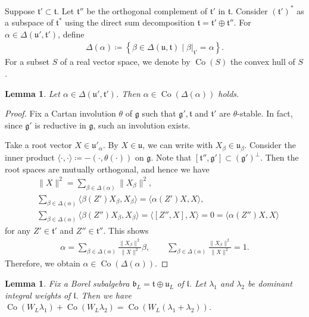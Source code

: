\documentclass[11pt]{article}
\numberwithin{equation}{section}
\numberwithin{equation}{section}
\newtheorem{Lemma}[Theorem]{Lemma}
\theoremstyle{definition}
\newcommand{\set}[1]{\left\{#1 \right\}}
\newcommand{\lie}[1]{\mathfrak{#1}}
\DeclareMathOperator{\Co}{\mathrm{Co}}
\begin{document}
Suppose $\lie{t'}\subset \lie{t}$.
Let $\lie{t}''$ be the orthogonal complement of $\lie{t}'$ in $\lie{t}$.
Consider $(\lie{t'})^*$ as a subspace of $\lie{t}^*$
using the direct sum decomposition $\lie{t}=\lie{t'} \oplus \lie{t''}$.
For $\alpha \in \Delta(\lie{u'}, \lie{t'})$, define
\begin{align*}
	\Delta(\alpha)\coloneq \set{\beta \in \Delta(\lie{u}, \lie{t})\mid \beta|_{\lie{t}'}=\alpha}.
\end{align*}
For a subset $S$ of a real vector space, we denote by $\Co(S)$ the convex hull of $S$.

\begin{Lemma}\label{lem:ConvexityRestriction}
	Let $\alpha \in \Delta(\lie{u'}, \lie{t'})$.
	Then $\alpha \in \Co(\Delta(\alpha))$ holds.
\end{Lemma}

\begin{proof}
	Fix a Cartan involution $\theta$ of $\lie{g}$ such that
	$\lie{g}', \lie{t}$ and $\lie{t}'$ are $\theta$-stable.
	In fact, since $\lie{g}'$ is reductive in $\lie{g}$, such an involution exists.

	Take a root vector $X \in \lie{u}'_{\alpha}$.
	By $X \in \lie{u}$, we can write  with $X_{\beta} \in \lie{u}_{\beta}$.
	Consider the inner product $\langle \cdot, \cdot \rangle \coloneq -(\cdot, \theta(\cdot))$ on $\lie{g}$.
	Note that $[\lie{t''}, \lie{g'}] \subset (\lie{g}')^\perp$.
	Then the root spaces are mutually orthogonal, and hence we have
	\begin{align*}
		&\|X\|^2= \sum_{\beta \in \Delta(\alpha)} \|X_\beta\|^2, \\
		&\sum_{\beta \in \Delta(\alpha)} \langle \beta(Z')X_\beta, X_\beta\rangle= \langle \alpha(Z')X, X\rangle, \\
		&\sum_{\beta \in \Delta(\alpha)} \langle \beta(Z'')X_\beta, X_\beta\rangle= \langle [Z'', X], X\rangle = 0 = \langle \alpha(Z'')X, X\rangle
	\end{align*}
	for any $Z' \in \lie{t'}$ and $Z'' \in \lie{t''}$.
	This shows
	\begin{align*}
		\alpha = \sum_{\beta \in \Delta(\alpha)} \frac{\|X_\beta\|^2}{\|X\|^2} \beta, \qquad \sum_{\beta \in \Delta(\alpha)} \frac{\|X_\beta\|^2}{\|X\|^2} = 1.
	\end{align*}
	Therefore, we obtain $\alpha \in \Co(\Delta(\alpha))$.
\end{proof}


\begin{Lemma}\label{lem:SumConvex}
	Fix a Borel subalgebra $\lie{b}_L = \lie{t}\oplus \lie{u}_L$ of $\lie{l}$.
	Let $\lambda_1$ and $\lambda_2$ be dominant integral weights of $\lie{l}$.
	Then we have $\Co(W_{L}\lambda_1)+\Co(W_{L}\lambda_2) = \Co(W_{L}(\lambda_1+\lambda_2))$.
\end{Lemma}
	
\end{document}
